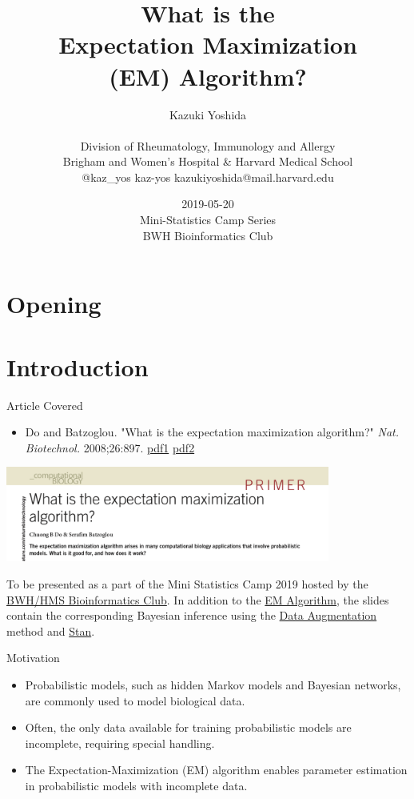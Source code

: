 \documentclass[dvipdfmx,bigger,aspectratio=169]{beamer}
\author{Kazuki Yoshida \\ \\ Division of Rheumatology, Immunology and Allergy \\ Brigham and Women's Hospital \& Harvard Medical School \\ \faTwitter @kaz\_yos \faGithub kaz-yos \faEnvelope kazukiyoshida@mail.harvard.edu}
\date{2019-05-20\\ Mini-Statistics Camp Series \\ BWH Bioinformatics Club \\}
\title{What is the \\ Expectation Maximization \\ (EM) Algorithm? \\}
\begin{document}
\maketitle
\section{Opening}
\label{sec:org6587e18}


\section{Introduction}
\label{sec:orgb8c11da}
\begin{frame}[label={sec:orgc8797f2}]{Article Covered}
\begin{itemize}
\item Do and Batzoglou. "What is the expectation maximization algorithm?" \emph{Nat. Biotechnol.} 2008;26:897. \cite{doWhatExpectationMaximization2008} \href{https://www.cmi.ac.in/\~madhavan/courses/dmml2019jan/literature/EM\_algorithm\_2coin\_example.pdf}{pdf1} \href{http://www.utdallas.edu/\~prr105020/biol6385/2019/lecture/lecture\_4\_em\_paper.pdf}{pdf2}
\end{itemize}
\begin{center}
\includegraphics[page=1,keepaspectratio,width=0.8\textwidth]{./source/em_algo.png}
\end{center}
\footnotesize
To be presented as a part of the Mini Statistics Camp 2019 hosted by the \href{http://bioinformatics.bwh.harvard.edu}{BWH/HMS Bioinformatics Club}. In addition to the \hyperlink{sec:orgaa8e108}{EM Algorithm}, the slides contain the corresponding Bayesian inference using the \hyperlink{sec:org5c7fb27}{Data Augmentation} method and \hyperlink{sec:org7027187}{Stan}.
\end{frame}

\begin{frame}[label={sec:orgcaea572}]{Motivation}
\begin{itemize}
\item Probabilistic models, such as hidden Markov models and Bayesian networks, are commonly used to model biological data.
\end{itemize}


\begin{itemize}
\item Often, the only data available for training probabilistic models are incomplete, requiring special handling.
\end{itemize}


\begin{itemize}
\item The Expectation-Maximization (EM) algorithm enables parameter estimation in probabilistic models with incomplete data.
\end{itemize}
\end{frame}
\end{document}

